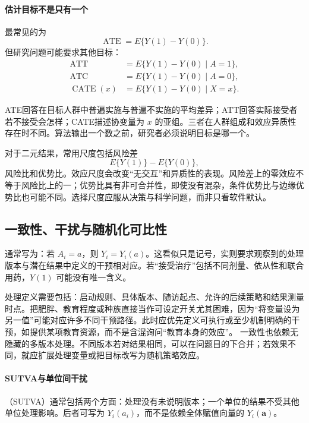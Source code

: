 \paragraph{估计目标不是只有一个}

最常见的为
\[
\operatorname{ATE}=E\{Y(1)-Y(0)\}.
\]
但研究问题可能要求其他目标：
\begin{align*}
\operatorname{ATT}&=E\{Y(1)-Y(0)\mid A=1\},\\
\operatorname{ATC}&=E\{Y(1)-Y(0)\mid A=0\},\\
\operatorname{CATE}(x)&=E\{Y(1)-Y(0)\mid X=x\}.
\end{align*}

ATE回答在目标人群中普遍实施与普遍不实施的平均差异；ATT回答实际接受者若不接受会怎样；CATE描述协变量为 $x$ 的亚组。三者在人群组成和效应异质性存在时不同。算法输出一个数之前，研究者必须说明目标是哪一个。

对于二元结果，常用尺度包括风险差
\[
E\{Y(1)\}-E\{Y(0)\},
\]
风险比和优势比。效应尺度会改变“无交互”和异质性的表现。风险差上的零效应不等于风险比上的一；优势比具有非可合并性，即使没有混杂，条件优势比与边缘优势比也可能不同。选择尺度应服从决策与科学问题，而非只看软件默认。

\subsection{一致性、干扰与随机化可比性}

通常写为：若 $A_i=a$，则 $Y_i=Y_i(a)$。这看似只是记号，实则要求观察到的处理版本与潜在结果中定义的干预相对应。若“接受治疗”包括不同剂量、依从性和联合用药，$Y(1)$ 可能没有唯一含义。

处理定义需要包括：启动规则、具体版本、随访起点、允许的后续策略和结果测量时点。把肥胖、教育程度或种族直接当作可设定开关尤其困难，因为“将变量设为另一值”可能对应许多不同干预路径。此时应优先定义可执行或至少机制明确的干预，如提供某项教育资源，而不是含混询问“教育本身的效应”。
一致性也依赖无隐藏的多版本处理。不同版本若对结果相同，可以在问题目的下合并；若效果不同，就应扩展处理变量或把目标改写为随机策略效应。

\paragraph{SUTVA与单位间干扰}

（SUTVA）通常包括两个方面：处理没有未说明版本；一个单位的结果不受其他单位处理影响。后者可写为 $Y_i(a_i)$，而不是依赖全体赋值向量的 $Y_i(\mathbf a)$。

